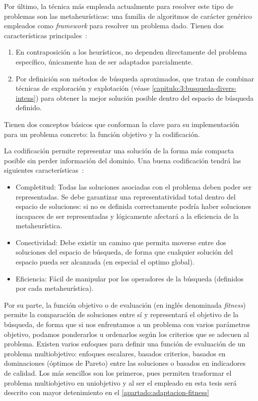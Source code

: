 Por último, la técnica más empleada actualmente para resolver este tipo de problemas son las metaheurísticas: una familia de algoritmos de carácter genérico empleados como \textit{framework} para resolver un problema dado. Tienen dos características principales~\cite{sota:metaheuristicas}:

\begin{enumerate}
	\item En contraposición a los heurísticos, no dependen directamente del problema específico, únicamente han de ser adaptados parcialmente.
	\item Por definición son métodos de búsqueda aproximados, que tratan de combinar técnicas de exploración y explotación (véase \autoref{capitulo:3:busqueda-divers-intens}) para obtener la mejor solución posible dentro del espacio de búsqueda definido.
\end{enumerate}

Tienen dos conceptos básicos que conforman la clave para su implementación para un problema concreto: la función objetivo y la codificación. 

La codificación permite representar una solución de la forma más compacta posible sin perder información del dominio. Una buena codificación tendrá las siguientes características~\cite{sota:metaheuristicas-design-impl}:

\begin{itemize}
	\item Completitud: Todas las soluciones asociadas con el problema deben poder ser representadas. Se debe garantizar una representatividad total dentro del espacio de soluciones: si no es definida correctamente podría haber soluciones incapaces de ser representadas y lógicamente afectará a la eficiencia de la metaheurística.
	\item Conectividad: Debe existir un camino que permita moverse entre dos soluciones del espacio de búsqueda, de forma que cualquier solución del espacio pueda ser alcanzada (en especial el optimo global).
	\item Eficiencia: Fácil de manipular por los operadores de la búsqueda (definidos por cada metaheurística).
\end{itemize}

Por su parte, la función objetivo o de evaluación (en inglés denominada \textit{fitness}) permite la comparación de soluciones entre sí y representará el objetivo de la búsqueda, de forma que si nos enfrentamos a un problema con varios parámetros objetivo, podamos ponderarlos u ordenarlos según los criterios que se adecuen al problema. Existen varios enfoques para definir una función de evaluación de un problema multiobjetivo: enfoques escalares, basados criterios, basados en dominaciones (óptimos de Pareto) entre las soluciones o basados en indicadores de calidad. Los más sencillos son los primeros, pues permiten trasformar el problema multiobjetivo en uniobjetivo y al ser el empleado en esta tesis será descrito con mayor detenimiento en el \autoref{apartado:adaptacion-fitness}


